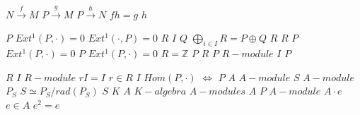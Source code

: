 \documentclass{article}
\begin{document}
$N \stackrel{f}{\longrightarrow} M$
$P \stackrel{g}{\longrightarrow} M$
$P \stackrel{h}{\longrightarrow} N$
$fh=g$
$h$
$P$
$Ext^1(P,\cdot)=0$
$Ext^1(\cdot,P)=0$
$R$
$I$
$Q$
$\bigoplus\limits_{i \in I} R = P \oplus Q$
$R$
$R$
$P$
$Ext^1(P,\cdot)=0$
$P$
$Ext^1(P,\cdot)=0$
$R=\mathbb{Z}$
$P$
$R$
$P$
$R-module$
$I$
$P$
$R$
$I$
$R-module$
$rI=I$
$r \in R$
$I$
$Hom(P,\cdot)$
$\Leftrightarrow$
$P$
$A$
$A-module$
$S$
$A-module$
$P_S$
$S \simeq P_S/rad(P_S)$
$S$
$K$
$A$
$K-algebra$
$A-modules$
$A$
$P$
$A-module$
$A \cdot e$
$e \in A$
$e^2=e$
\end{document}

